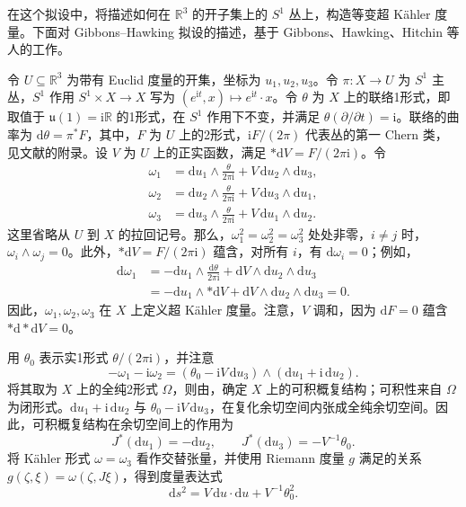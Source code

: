 在这个拟设中，将描述如何在 $\mathbb R^3$ 的开子集上的 $S^1$ 丛上，构造等变超 Kähler 度量。下面对 Gibbons--Hawking 拟设的描述，基于 Gibbons、Hawking、Hitchin 等人的工作。

令 $U\subseteq\mathbb R^3$ 为带有 Euclid 度量的开集，坐标为 $u_1,u_2,u_3$。令 $\pi\colon X\to U$ 为 $S^1$ 主丛，$S^1$ 作用 $S^1\times X\to X$ 写为 $(e^{\mathrm it},x)\mapsto e^{\mathrm it}\cdot x$。令 $\theta$ 为 $X$ 上的联络1形式，即取值于 $\mathfrak u(1)=\mathrm i\mathbb R$ 的1形式，在 $S^1$ 作用下不变，并满足 $\theta(\partial/\partial t)=\mathrm i$。联络的曲率为 $\mathrm d\theta=\pi^*F$，其中，$F$ 为 $U$ 上的2形式，$\mathrm iF/(2\pi)$ 代表丛的第一 Chern 类，见文献的附录。设 $V$ 为 $U$ 上的正实函数，满足 $*\mathrm dV=F/(2\pi\mathrm i)$。令
\[
\begin{aligned}
\omega_1&=\mathrm du_1\wedge\frac{\theta}{2\pi\mathrm i}
+V\,\mathrm du_2\wedge\mathrm du_3,\\
\omega_2&=\mathrm du_2\wedge\frac{\theta}{2\pi\mathrm i}
+V\,\mathrm du_3\wedge\mathrm du_1,\\
\omega_3&=\mathrm du_3\wedge\frac{\theta}{2\pi\mathrm i}
+V\,\mathrm du_1\wedge\mathrm du_2.
\end{aligned}
\]
这里省略从 $U$ 到 $X$ 的拉回记号。那么，$\omega_1^2=\omega_2^2=\omega_3^2$ 处处非零，$i\ne j$ 时，$\omega_i\wedge\omega_j=0$。此外，$*\mathrm dV=F/(2\pi\mathrm i)$ 蕴含，对所有 $i$，有 $\mathrm d\omega_i=0$；例如，
\[
\begin{aligned}
\mathrm d\omega_1
&=-\mathrm du_1\wedge\frac{\mathrm d\theta}{2\pi\mathrm i}
+\mathrm dV\wedge\mathrm du_2\wedge\mathrm du_3\\
&=-\mathrm du_1\wedge*\mathrm dV
+\mathrm dV\wedge\mathrm du_2\wedge\mathrm du_3=0.
\end{aligned}
\]
因此，$\omega_1,\omega_2,\omega_3$ 在 $X$ 上定义超 Kähler 度量。注意，$V$ 调和，因为 $\mathrm dF=0$ 蕴含 $*\mathrm d*\mathrm dV=0$。

用 $\theta_0$ 表示实1形式 $\theta/(2\pi\mathrm i)$，并注意
\[
-\omega_1-\mathrm i\omega_2
=(\theta_0-\mathrm iV\,\mathrm du_3)\wedge(\mathrm du_1+\mathrm i\,\mathrm du_2).
\]
将其取为 $X$ 上的全纯2形式 $\Omega$，则由，确定 $X$ 上的可积概复结构；可积性来自 $\Omega$ 为闭形式。$\mathrm du_1+\mathrm i\,\mathrm du_2$ 与 $\theta_0-\mathrm iV\,\mathrm du_3$，在复化余切空间内张成全纯余切空间。因此，可积概复结构在余切空间上的作用为
\[
J^*(\mathrm du_1)=-\mathrm du_2,\qquad
J^*(\mathrm du_3)=-V^{-1}\theta_0.
\]
将 Kähler 形式 $\omega=\omega_3$ 看作交替张量，并使用 Riemann 度量 $g$ 满足的关系 $g(\zeta,\xi)=\omega(\zeta,J\xi)$，得到度量表达式
\[
\mathrm ds^2=V\,\mathrm du\cdot\mathrm du+V^{-1}\theta_0^2.
\]

